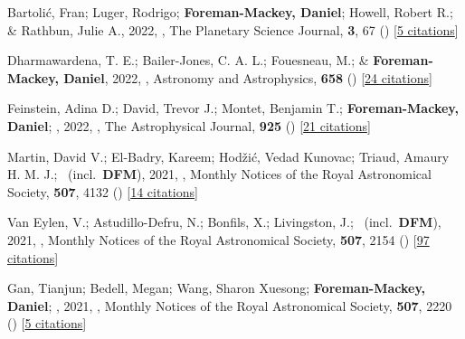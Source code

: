 \item[{\color{numcolor}\scriptsize77}] Bartoli{\'c}, Fran; Luger, Rodrigo; \textbf{Foreman-Mackey, Daniel}; Howell, Robert R.; \& Rathbun, Julie A., 2022, , The Planetary Science Journal, \textbf{3}, 67 () [\href{https://ui.adsabs.harvard.edu/abs/2022PSJ.....3...67B}{5 citations}]

\item[{\color{numcolor}\scriptsize76}] Dharmawardena, T. E.; Bailer-Jones, C. A. L.; Fouesneau, M.; \& \textbf{Foreman-Mackey, Daniel}, 2022, , Astronomy and Astrophysics, \textbf{658} () [\href{https://ui.adsabs.harvard.edu/abs/2022A&A...658A.166D}{24 citations}]

\item[{\color{numcolor}\scriptsize75}] Feinstein, Adina D.; David, Trevor J.; Montet, Benjamin T.; \textbf{Foreman-Mackey, Daniel}; \etal, 2022, , The Astrophysical Journal, \textbf{925} () [\href{https://ui.adsabs.harvard.edu/abs/2022ApJ...925L...2F}{21 citations}]

\item[{\color{numcolor}\scriptsize74}] Martin, David V.; El-Badry, Kareem; Hod{\v{z}}i{\'c}, Vedad Kunovac; Triaud, Amaury H. M. J.; \etal\ (incl.\ \textbf{DFM}), 2021, , Monthly Notices of the Royal Astronomical Society, \textbf{507}, 4132 () [\href{https://ui.adsabs.harvard.edu/abs/2021MNRAS.507.4132M}{14 citations}]

\item[{\color{numcolor}\scriptsize73}] Van Eylen, V.; Astudillo-Defru, N.; Bonfils, X.; Livingston, J.; \etal\ (incl.\ \textbf{DFM}), 2021, , Monthly Notices of the Royal Astronomical Society, \textbf{507}, 2154 () [\href{https://ui.adsabs.harvard.edu/abs/2021MNRAS.507.2154V}{97 citations}]

\item[{\color{numcolor}\scriptsize72}] Gan, Tianjun; Bedell, Megan; Wang, Sharon Xuesong; \textbf{Foreman-Mackey, Daniel}; \etal, 2021, , Monthly Notices of the Royal Astronomical Society, \textbf{507}, 2220 () [\href{https://ui.adsabs.harvard.edu/abs/2021MNRAS.507.2220G}{5 citations}]

